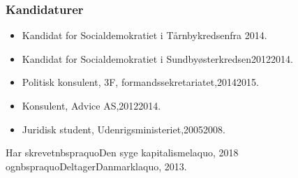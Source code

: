 \documentclass[11pt, a4paper]{awesome-cv}
\begin{document}
\begin{cvletter}
\subsubsection*{Kandidaturer}
\begin{itemize}
\item Kandidat for Socialdemokratiet i Tårnbykredsenfra 2014.
\item Kandidat for Socialdemokratiet i Sundbyøsterkredsen20122014.
\end{itemize}
\begin{itemize}
\item Politisk konsulent, 3F, formandssekretariatet,20142015.
\item Konsulent, Advice AS,20122014.
\item Juridisk student, Udenrigsministeriet,20052008.
\end{itemize}
Har skrevetnbspraquoDen syge kapitalismelaquo, 2018 ognbspraquoDeltagerDanmarklaquo, 2013.

\end{cvletter}
\end{document}
